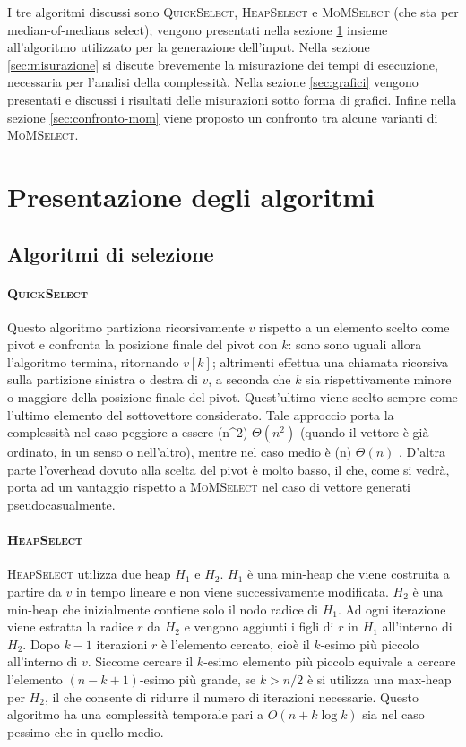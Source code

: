 \documentclass[a4paper]{article}
\newcommand{\QuickSelect}{\textsc{QuickSelect}}
\newcommand{\HeapSelect}{\textsc{HeapSelect}}
\newcommand{\MoMSelect}{\textsc{MoMSelect}}
\newcommand{\Tquad}{\ifmmode \Theta(n^2) \else $\Theta(n^2)$ \fi} %
\newcommand{\Tlin}{\ifmmode \Theta(n) \else $\Theta(n)$ \fi} %
\begin{document}
I tre algoritmi discussi sono \QuickSelect{}, \HeapSelect{} e \MoMSelect{} (che sta per median-of-medians select); vengono presentati nella sezione \ref{sec:presentazione-algoritmi} insieme all'algoritmo utilizzato per la generazione dell'input.
Nella sezione \ref{sec:misurazione} si discute brevemente la misurazione dei tempi di esecuzione, necessaria per l'analisi della complessità.
Nella sezione \ref{sec:grafici} vengono presentati e discussi i risultati delle misurazioni sotto forma di grafici.
Infine nella sezione \ref{sec:confronto-mom} viene proposto un confronto tra alcune varianti di \MoMSelect{}.



\section{Presentazione degli algoritmi}
\label{sec:presentazione-algoritmi}

\subsection{Algoritmi di selezione}
\paragraph{\QuickSelect}
Questo algoritmo partiziona ricorsivamente $v$ rispetto a un elemento scelto come pivot e confronta la posizione finale del pivot con $k$: sono sono uguali allora l'algoritmo termina, ritornando $v[k]$; altrimenti effettua una chiamata ricorsiva sulla partizione sinistra o destra di $v$, a seconda che $k$ sia rispettivamente minore o maggiore della posizione finale del pivot.
Quest'ultimo viene scelto sempre come l'ultimo elemento del sottovettore considerato.
Tale approccio porta la complessità nel caso peggiore a essere \Tquad{} (quando il vettore è già ordinato, in un senso o nell'altro), mentre nel caso medio è \Tlin.
D'altra parte l'overhead dovuto alla scelta del pivot è molto basso, il che, come si vedrà, porta ad un vantaggio rispetto a \MoMSelect{} nel caso di vettore generati pseudocasualmente.

\paragraph{\HeapSelect}
\HeapSelect{} utilizza due heap $H_1$ e $H_2$.
$H_1$ è una min-heap che viene costruita a partire da $v$ in tempo lineare e non viene successivamente modificata.
$H_2$ è una min-heap che inizialmente contiene solo il nodo radice di $H_1$.
Ad ogni iterazione viene estratta la radice $r$ da $H_2$ e vengono aggiunti i figli di $r$ in $H_1$ all'interno di $H_2$.
Dopo $k-1$ iterazioni $r$ è l'elemento cercato, cioè il $k$-esimo più piccolo all'interno di $v$.
Siccome cercare il $k$-esimo elemento più piccolo equivale a cercare l'elemento $(n-k+1)$-esimo più grande, se $k>n/2$ è si utilizza una max-heap per $H_2$, il che consente di ridurre il numero di iterazioni necessarie.
Questo algoritmo ha una complessità temporale pari a $O(n+k\log k)$ sia nel caso pessimo che in quello medio.
\end{document}

